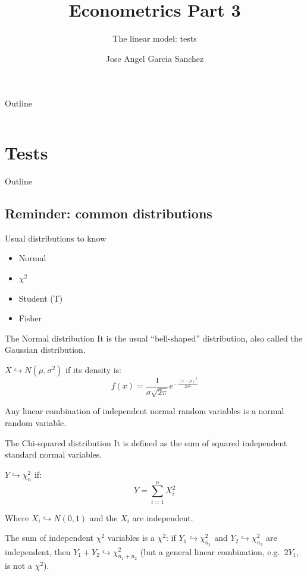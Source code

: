\documentclass[aspectratio=169]{beamer}
\title{Econometrics Part 3}
\subtitle{The linear model: tests}
\author{Jose Angel Garcia Sanchez}
\institute{Sorbonne Data Analytics}
\date{} %
\begin{document}
{
\begin{frame}
\titlepage
\end{frame}
}

\begin{frame}{Outline}
\begin{columns}[T]
\tableofcontents[sections={1-2}]
\tableofcontents[sections={3-4}]
\end{columns}
\end{frame}

\section{Tests}

\begin{frame}{Outline}
\end{frame}

\subsection{Reminder: common distributions}

\begin{frame}{Usual distributions to know}
\begin{itemize}
    \item Normal
    \item $\chi^2$
    \item Student (T)
    \item Fisher
\end{itemize}
\end{frame}

\begin{frame}{The Normal distribution}
It is the usual ``bell-shaped'' distribution, also called the Gaussian distribution.

$X \hookrightarrow N(\mu, \sigma^2)$ if its density is:
\[
f(x) = \frac{1}{\sigma\sqrt{2\pi}} e^{-\frac{(x-\mu)^2}{2\sigma^2}}
\]

Any linear combination of independent normal random variables is a normal random variable.
\end{frame}

\begin{frame}{The Chi-squared distribution}
It is defined as the sum of squared independent standard normal variables.

$Y \hookrightarrow \chi_n^2$ if:
\[
Y = \sum_{i=1}^{n} X_i^2
\]

Where $X_i \hookrightarrow N(0,1)$ and the $X_i$ are independent.

The sum of independent $\chi^2$ variables is a $\chi^2$: if $Y_1 \hookrightarrow \chi_{n_1}^2$ and $Y_2 \hookrightarrow \chi_{n_2}^2$ are independent, then $Y_1 + Y_2 \hookrightarrow \chi_{n_1+n_2}^2$ (but a general linear combination, e.g.\ $2Y_1$, is not a $\chi^2$).
\end{frame}
\end{document}
